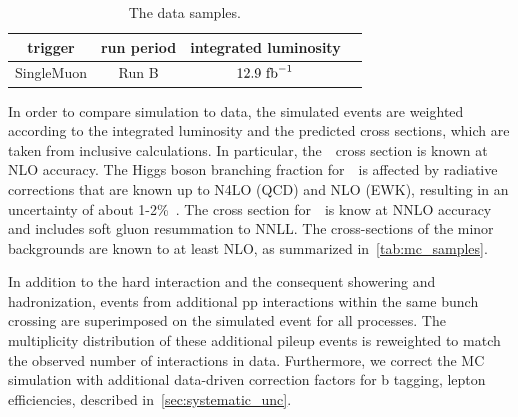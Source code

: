 \begin{table}[h!]
\begin{center}
\caption[The data samples used in the~\ttHbb~ analysis]{The data samples.}
\label{tab:data_samples}
\begin{tabular}{cccc}
\hline
trigger & run period & integrated luminosity \\
\hline
SingleMuon & Run B &~$12.9~\mathrm{fb}^{-1}$~\\
\hline
\hline
\end{tabular}
\end{center}
\end{table}

In order to compare simulation to data, the simulated events are weighted according to the integrated luminosity and the predicted cross sections, which are taken from inclusive calculations. In particular, the~\ttH~cross section is known at NLO accuracy\cite{Dittmaier:1318996,Beenakker:2001rj,Beenakker:2002nc,Dawson:2002tg,Dawson:2003zu}. The Higgs boson branching fraction for~\Hbb~is affected by radiative corrections that are known up to N4LO (QCD) and NLO (EWK), resulting in an uncertainty of about 1-2\%~\cite{Djouadi:1997yw,Butterworth:2010ym,deFlorian:2016spz}.
The cross section for~\ttbar~is know at NNLO accuracy and includes soft gluon resummation to NNLL\cite{Czakon:2011xx}. The cross-sections of the minor backgrounds are known to at least NLO, as summarized in~\cref{tab:mc_samples}.

In addition to the hard interaction and the consequent showering and hadronization, events from additional pp interactions within the same bunch crossing are superimposed on the simulated event for all processes. The multiplicity distribution of these additional pileup events is reweighted to match the observed number of interactions in data. Furthermore, we correct the MC simulation with additional data-driven correction factors for b tagging, lepton efficiencies, described in~\cref{sec:systematic_unc}.

